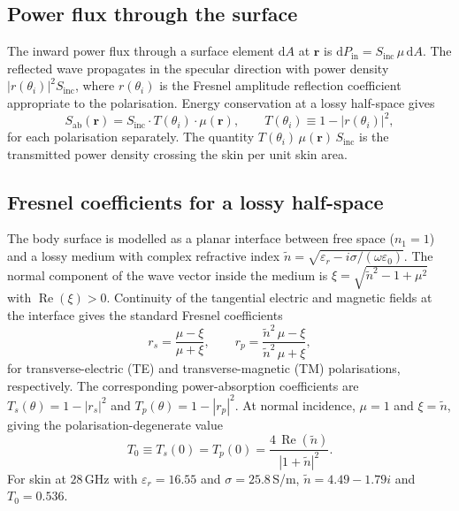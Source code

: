 \documentclass[journal,twocolumn,10pt]{IEEEtran}
\theoremstyle{plain}
\theoremstyle{remark}
\newcommand{\rr}{\mathbf{r}}
\newcommand{\Sinc}{S_{\mathrm{inc}}}
\newcommand{\Sab}{S_{\mathrm{ab}}}
\newcommand{\ntilde}{\tilde{n}}
\newcommand{\diff}{\mathrm{d}}
\DeclareMathOperator{\RE}{Re}
\begin{document}
\subsection{Power flux through the surface}
The inward power flux through a surface element $\diff A$ at $\rr$
is $\diff P_{\mathrm{in}} = \Sinc \, \mu \, \diff A$. The reflected
wave propagates in the specular direction with power density
$|r(\theta_i)|^2 \Sinc$, where $r(\theta_i)$ is the Fresnel
amplitude reflection coefficient appropriate to the polarisation.
Energy conservation at a lossy half-space gives
\begin{equation}\label{eq:Sab-pol}
  \Sab(\rr) = \Sinc \cdot T(\theta_i) \cdot \mu(\rr),
  \qquad T(\theta_i) \equiv 1 - |r(\theta_i)|^2,
\end{equation}
for each polarisation separately. The quantity
$T(\theta_i)\,\mu(\rr)\,\Sinc$ is the transmitted power density
crossing the skin per unit skin area.

\subsection{Fresnel coefficients for a lossy half-space}
The body surface is modelled as a planar interface between free
space ($n_1 = 1$) and a lossy medium with complex refractive index
$\ntilde = \sqrt{\varepsilon_r - i\sigma/(\omega\varepsilon_0)}$.
The normal component of the wave vector inside the medium is
$\xi = \sqrt{\ntilde^2 - 1 + \mu^2}$ with $\RE(\xi) > 0$. Continuity
of the tangential electric and magnetic fields at the interface
gives the standard Fresnel coefficients
\begin{equation}\label{eq:rs-rp}
  r_s = \frac{\mu - \xi}{\mu + \xi},
  \qquad
  r_p = \frac{\ntilde^2\,\mu - \xi}{\ntilde^2\,\mu + \xi},
\end{equation}
for transverse-electric (TE) and transverse-magnetic (TM)
polarisations, respectively. The corresponding power-absorption
coefficients are $T_s(\theta) = 1 - |r_s|^2$ and $T_p(\theta) = 1 -
|r_p|^2$. At normal incidence, $\mu = 1$ and $\xi = \ntilde$, giving
the polarisation-degenerate value
\begin{equation}\label{eq:T0}
  T_0 \equiv T_s(0) = T_p(0) = \frac{4\,\RE(\ntilde)}{|1+\ntilde|^2}.
\end{equation}
For skin at $28\,$GHz with $\varepsilon_r = 16.55$ and
$\sigma = 25.8\,$S/m, $\ntilde = 4.49 - 1.79i$ and $T_0 = 0.536$.
\end{document}
